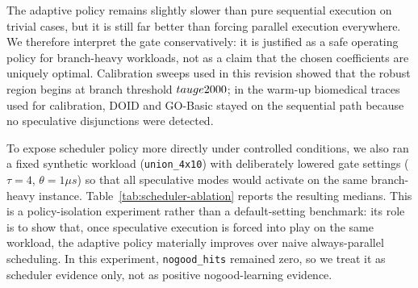 \documentclass[preprint,12pt,times]{elsarticle}
\begin{document}
\begin{table}[htbp]
\centering
\caption{Adaptive Threshold Performance on Small Disjunctive Cases}
\label{tab:adaptive}
\end{table}

The adaptive policy remains slightly slower than pure sequential execution on trivial cases, but it is still far better than forcing parallel execution everywhere. We therefore interpret the gate conservatively: it is justified as a safe operating policy for branch-heavy workloads, not as a claim that the chosen coefficients are uniquely optimal. Calibration sweeps used in this revision showed that the robust region begins at branch threshold $\\tau \\ge 2000$; in the warm-up biomedical traces used for calibration, DOID and GO-Basic stayed on the sequential path because no speculative disjunctions were detected.

To expose scheduler policy more directly under controlled conditions, we also ran a fixed synthetic workload (\texttt{union\_4x10}) with deliberately lowered gate settings ($\tau=4$, $\theta=1\mu s$) so that all speculative modes would activate on the same branch-heavy instance. Table~\ref{tab:scheduler-ablation} reports the resulting medians. This is a policy-isolation experiment rather than a default-setting benchmark: its role is to show that, once speculative execution is forced into play on the same workload, the adaptive policy materially improves over naive always-parallel scheduling. In this experiment, \texttt{nogood\_hits} remained zero, so we treat it as scheduler evidence only, not as positive nogood-learning evidence.
\end{document}
